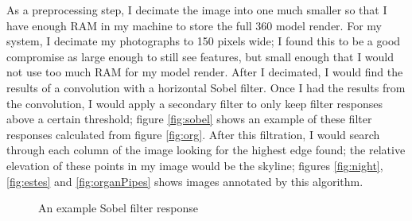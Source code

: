 \documentclass{acm_proc_article-sp}
\begin{document}
As a preprocessing step, I decimate the image into one much smaller so that I have enough RAM in my machine to store the full 360 model render.  For my system, I decimate my photographs to 150 pixels wide; I found this to be a good compromise as large enough to still see features, but small enough that I would not use too much RAM for my model render. After I decimated, I would find the results of a convolution with a horizontal Sobel filter. Once I had the results from the convolution, I would apply a secondary filter to only keep filter responses above a certain threshold; figure \ref{fig:sobel} shows an example of these filter responses calculated from figure \ref{fig:org}.  After this filtration, I would search through each column of the image looking for the highest edge found; the relative elevation of these points in my image would be the skyline; figures \ref{fig:night}, \ref{fig:estes} and \ref{fig:organPipes} shows images annotated by this algorithm. 
\begin{figure}
	\centering
	\caption{An example Sobel filter response}
\end{figure}
\end{document}
